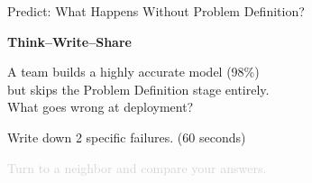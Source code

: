\documentclass[aspectratio=169, 12pt]{beamer}
\begin{document}
\begin{frame}{Predict: What Happens Without Problem Definition?}
\note{
%
%
%
%
}

\centering
\vspace{0.6cm}
{\Large\bfseries Think--Write--Share}

\vspace{0.4cm}
{\large A team builds a highly accurate model (98\%)\\
but skips the Problem Definition stage entirely.\\[0.2cm]
\alert{What goes wrong at deployment?}}

\vspace{0.4cm}
{\normalsize Write down 2 specific failures. \textcolor{midgray}{(60 seconds)}}

\vspace{0.3cm}
{\small\textcolor{lightgray}{Turn to a neighbor and compare your answers.}}

\end{frame}
\end{document}
